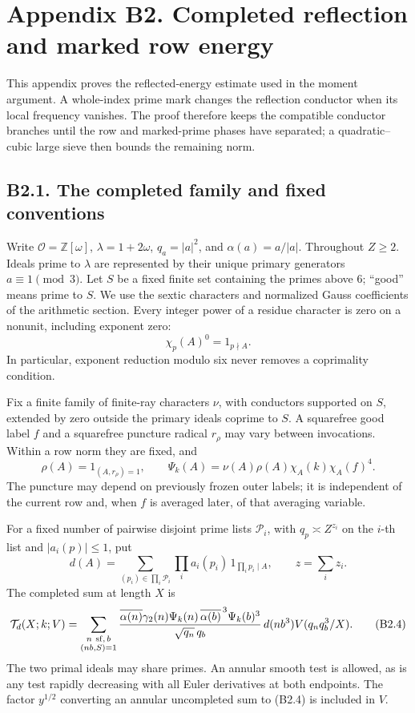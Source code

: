 \documentclass[11pt,a4paper]{article}
\begin{document}
\hypertarget{appendix-b2.-completed-reflection-and-marked-row-energy}{%
\section{Appendix B2. Completed reflection and marked row
energy}\label{appendix-b2.-completed-reflection-and-marked-row-energy}}

This appendix proves the reflected-energy estimate used in the moment
argument. A whole-index prime mark changes the reflection conductor when
its local frequency vanishes. The proof therefore keeps the compatible
conductor branches until the row and marked-prime phases have separated;
a quadratic--cubic large sieve then bounds the remaining norm.

\hypertarget{b2.1.-the-completed-family-and-fixed-conventions}{%
\subsection{B2.1. The completed family and fixed
conventions}\label{b2.1.-the-completed-family-and-fixed-conventions}}

Write \(\mathcal O=\mathbb Z[\omega]\), \(\lambda=1+2\omega\),
\(q_a=|a|^2\), and \(\alpha(a)=a/|a|\). Throughout \(Z\ge2\). Ideals
prime to \(\lambda\) are represented by their unique primary generators
\(a\equiv1\pmod3\). Let \(S\) be a fixed finite set containing the
primes above \(6\); ``good'' means prime to \(S\). We use the sextic
characters and normalized Gauss coefficients of the arithmetic section.
Every integer power of a residue character is zero on a nonunit,
including exponent zero: \[
\chi_p(A)^0=1_{p\nmid A}.
\tag{B2.1}
\] In particular, exponent reduction modulo six never removes a
coprimality condition.

Fix a finite family of finite-ray characters \(\nu\), with conductors
supported on \(S\), extended by zero outside the primary ideals coprime
to \(S\). A squarefree good label \(f\) and a squarefree puncture
radical \(r_\rho\) may vary between invocations. Within a row norm they
are fixed, and \[
\rho(A)=1_{(A,r_\rho)=1},\qquad
\Psi_k(A)=\nu(A)\rho(A)\chi_A(k)\chi_A(f)^4.
\tag{B2.2}
\] The puncture may depend on previously frozen outer labels; it is
independent of the current row and, when \(f\) is averaged later, of
that averaging variable.

For a fixed number of pairwise disjoint prime lists \(\mathcal P_i\),
with \(q_p\asymp Z^{z_i}\) on the \(i\)-th list and \(|a_i(p)|\le1\),
put \[
d(A)=\sum_{(p_i)\in\prod_i\mathcal P_i}
       \prod_i a_i(p_i)\,1_{\prod_i p_i\mid A},
\qquad z=\sum_i z_i.
\tag{B2.3}
\] The completed sum at length \(X\) is \[
\mathcal T_d(X;k;V)=
\sum_{\substack{n\ {\rm sf},\,b\\ (nb,S)=1}}
\frac{\overline{\alpha(n)}\gamma_2(n)\Psi_k(n)\,
      \overline{\alpha(b)}^{\,3}\Psi_k(b)^3}
     {\sqrt{q_n}\,q_b}\,
d(nb^3)V(q_nq_b^3/X).
\tag{B2.4}
\] The two primal ideals may share primes. An annular smooth test is
allowed, as is any test rapidly decreasing with all Euler derivatives at
both endpoints. The factor \(y^{1/2}\) converting an annular uncompleted
sum to (B2.4) is included in \(V\).
\end{document}
